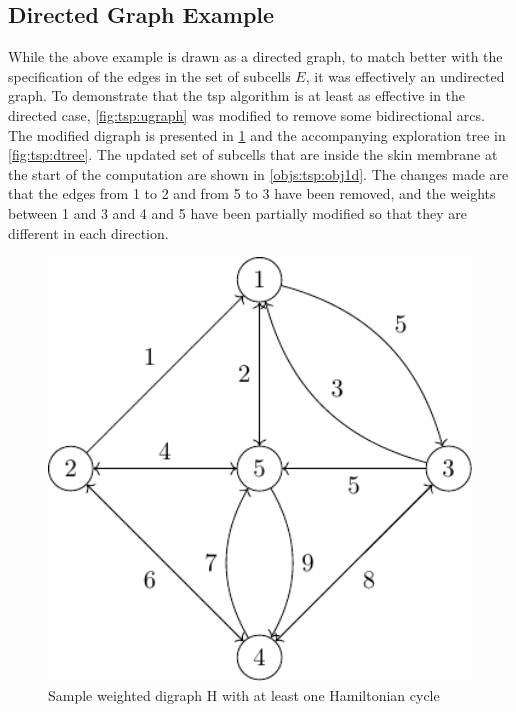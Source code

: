 
\subsection{Directed Graph Example}
While the above example is drawn as a directed graph, to match better with the specification of the edges in the set of subcells \(E\), it was effectively an undirected graph.  To demonstrate that the \gls{tsp} algorithm is at least as effective in the directed case, \cref{fig:tsp:ugraph} was modified to remove some bidirectional arcs.  The modified digraph is presented in \cref{fig:tsp:digraph} and the accompanying exploration tree in \cref{fig:tsp:dtree}.  The updated set of subcells that are inside the skin membrane at the start of the computation are shown in \cref{objs:tsp:obj1d}.  The changes made are that the edges from 1 to 2 and from 5 to 3 have been removed, and the weights between 1 and 3 and 4 and 5 have been partially modified so that they are different in each direction.

\begin{figure}
\centering
\includegraphics[keepaspectratio,width=1.0\textwidth,height=0.35\textheight]{chapters/tsp/figs/ugraph-figure2}
\caption{\label{fig:tsp:digraph}Sample weighted digraph H with at least one Hamiltonian cycle}
\end{figure}

